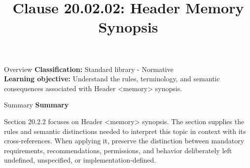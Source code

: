 \documentclass[10pt,letterpaper]{article}
\title{Clause 20.02.02: Header Memory Synopsis}
\author{}
\date{}
\begin{document}
\maketitle
\begin{CornellOverviewBox}{Overview}
\textbf{Classification:} Standard library - Normative\\[2pt]
\textbf{Learning objective:} Understand the rules, terminology, and semantic consequences associated with Header <memory> synopsis.
\end{CornellOverviewBox}\begin{CornellSummaryBox}{Summary}
{\sffamily\bfseries\color{Accent} Summary}\par\vspace{3pt}Section 20.2.2 focuses on Header <memory> synopsis. The section supplies the rules and semantic distinctions needed to interpret this topic in context with its cross-references. When applying it, preserve the distinction between mandatory requirements, recommendations, permissions, and behavior deliberately left undefined, unspecified, or implementation-defined.
\end{CornellSummaryBox}
\end{document}
